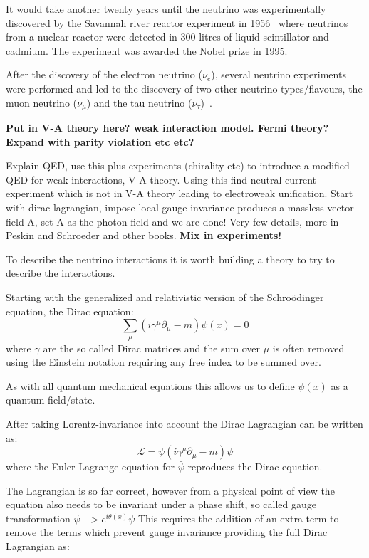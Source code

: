 It would take another twenty years until the neutrino was experimentally discovered by the Savannah river reactor experiment in 1956~\cite{6Reines} where neutrinos from a nuclear reactor were detected in 300 litres of liquid scintillator and cadmium. The experiment was awarded the Nobel prize in 1995.

After the discovery of the electron neutrino ($\nu_e$), several neutrino experiments were performed and led to the discovery of two other neutrino types/flavours, the muon neutrino ($\nu_\mu$) and the tau neutrino ($\nu_\tau$)~\cite{7Danby, 8Perl, Fix1}.

\textbf{Put in V-A theory here? weak interaction model. Fermi theory?}
\textbf{Expand with parity violation etc etc?}

Explain QED, use this plus experiments (chirality etc) to introduce a modified QED for weak interactions, V-A theory. Using this find neutral current experiment which is not in V-A theory leading to electroweak unification.
Start with dirac lagrangian, impose local gauge invariance produces a massless vector field A, set A as the photon field and we are done! 
Very few details, more in Peskin and Schroeder and other books.
\textbf{Mix in experiments!}
\fi

To describe the neutrino interactions it is worth building a theory to try to describe the interactions. 

Starting with the generalized and relativistic version of the Schro\"{o}dinger equation, the Dirac equation:
\begin{equation}
\sum_\mu (i\gamma^\mu \partial_\mu - m)\psi(x) = 0
\end{equation}
where $\gamma$ are the so called Dirac matrices and the sum over $\mu$ is often removed using the Einstein notation requiring any free index to be summed over.

As with all quantum mechanical equations this allows us to define $\psi(x)$ as a quantum field/state.

After taking Lorentz-invariance into account the Dirac Lagrangian can be written as:
\begin{equation}
\mathcal{L} = \bar{\psi}(i\gamma^\mu\partial_\mu-m)\psi
\end{equation}
where the Euler-Lagrange equation for $\bar{\psi}$ reproduces the Dirac equation.

The Lagrangian is so far correct, however from a physical point of view the equation also needs to be invariant under a phase shift, so called gauge transformation $\psi -> e^{i\theta(x)}\psi$ This requires the addition of an extra term to remove the terms which prevent gauge invariance providing the full Dirac Lagrangian as:

